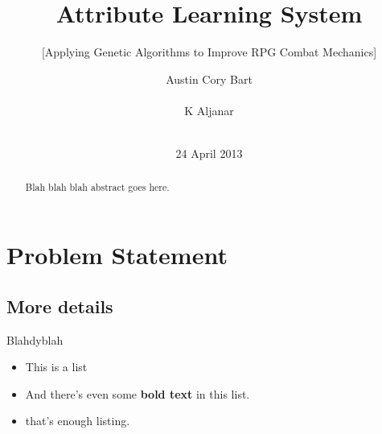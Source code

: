 \documentclass{acm_proc_article-sp}
\begin{document}
\title{Attribute Learning System}
\subtitle{[Applying Genetic Algorithms to Improve RPG Combat Mechanics]} %



\author{
\alignauthor
Austin Cory Bart\\
       \\
\alignauthor
K Aljanar\\
       \\
\alignauthor
}

\date{24 April 2013}

\maketitle
\begin{abstract}
Blah blah blah abstract goes here.
\end{abstract}




\section{Problem Statement}
    
	
	\subsection{More details}

    Blahdyblah

\begin{itemize}
	\item This is a list
	\item And there's even some \textbf{bold text} in this list.
	\item that's enough listing.
\end{itemize}
\end{document}
